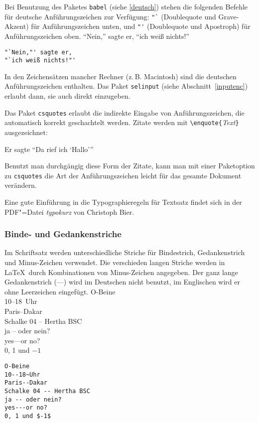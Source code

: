 Bei Benutzung des Paketes \texttt{babel} (siehe \ref{deutsch})
stehen die folgenden Befehle für 
deutsche Anführungszeichen zur Verfügung:
\lstinline|"`| (Doublequote und Grave-Akzent) für Anführungszeichen
unten,
und
\lstinline|"'| (Doublequote und Apostroph) für Anführungszeichen oben.
\exa
"`Nein,"' sagte er,
"`ich weiß nichts!"'
\exb
\begin{verbatim}
"`Nein,"' sagte er,
"`ich weiß nichts!"'
\end{verbatim}
\exc
In den Zeichensätzen mancher Rechner (z.\,B. Macintosh) sind die deutschen 
Anführungszeichen enthalten.  Das Paket \texttt{selinput} (siehe
Abschnitt~\ref{inputenc}) erlaubt dann, sie auch direkt einzugeben.

Das Paket \texttt{csquotes} erlaubt die indirekte Eingabe von Anführungszeichen, die automatisch korrekt geschachtelt werden. Zitate werden mit \lstinline|\enquote{|\textit{Text}\lstinline|}| ausgezeichnet:

\begin{LTXexample}
Er sagte \enquote{Da rief ich
\enquote{Hallo}}
\end{LTXexample}

Benutzt man durchgängig diese Form der Zitate, kann man mit einer Paketoption zu \texttt{csquotes} die Art der Anführungszeichen leicht für das gesamte Dokument verändern.

Eine gute Einführung in die Typographieregeln für Textsatz findet sich in der PDF"=Datei \emph{typokurz} von Christoph Bier\cite{typokurz}.

\subsubsection{Binde- und Gedankenstriche}
 
Im Schriftsatz werden unterschiedliche Striche für Bindestrich,
Gedankenstrich und Minus-Zeichen verwendet.
Die verschieden langen Striche werden in \LaTeX\ durch
Kombinationen von Minus-Zeichen angegeben. Der ganz lange
Gedankenstrich (\mbox{---}) wird im Deutschen nicht benutzt, im
Englischen wird er ohne Leerzeichen eingefügt.
\exa
O-Beine \\
10--18~Uhr \\
Paris--Dakar \\
Schalke 04 -- Hertha BSC \\
ja -- oder nein? \\
yes---or no? \\
0, 1 und $-1$
\exb
\begin{verbatim}
O-Beine
10--18~Uhr
Paris--Dakar
Schalke 04 -- Hertha BSC
ja -- oder nein?
yes---or no?
0, 1 und $-1$
\end{verbatim}
\exc
 
